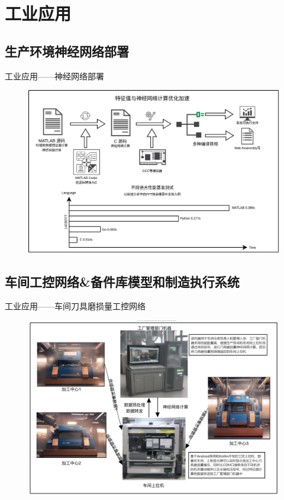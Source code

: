 \section{工业应用}
% 
% 
\subsection{生产环境神经网络部署}
\begin{frame}{工业应用——神经网络部署}
\begin{figure}[htp]
    \centering
    \includegraphics[width=11.5cm]{工业应用/compile_chain.jpg}
\end{figure}
\end{frame}
% 
% 
\subsection{车间工控网络\&备件库模型和制造执行系统}
\begin{frame}{工业应用——车间刀具磨损量工控网络}
% 
\begin{figure}[htp]
    \centering
    \includegraphics[width=11.5cm]{工业应用/车间网络.png}
\end{figure}
% 
\end{frame}

